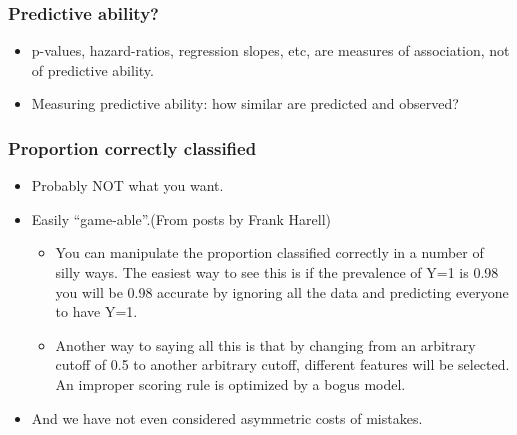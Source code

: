 \begin{frame}
\frametitle{Predictive ability?}
\begin{itemize}
\item p-values, hazard-ratios, regression slopes, etc, are measures of
  association, not of predictive ability.
\vspace*{20pt}

\item Measuring predictive ability: how similar are predicted and observed?

\end{itemize}
\end{frame}



\begin{frame}
  \frametitle{Proportion correctly classified}
  \begin{itemize}
  \item Probably NOT what you want.
  \item Easily ``game-able''.(From posts by Frank Harell)
    \begin{itemize}
  \item You can manipulate the proportion classified correctly in a number
    of silly ways. The easiest way to see this is if the prevalence of Y=1
    is 0.98 you will be 0.98 accurate by ignoring all the data and
    predicting everyone to have Y=1.
  \item Another way to saying all this is that by changing from an
    arbitrary cutoff of 0.5 to another arbitrary cutoff, different
    features will be selected. An improper scoring rule is optimized by a
    bogus model.
    \end{itemize}
  \item And we have not even considered asymmetric costs of mistakes.
  \end{itemize}
\end{frame}


